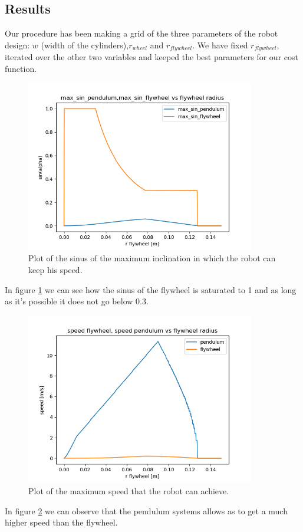 \subsection{Results}
Our procedure has been making a grid of the three parameters of the robot design: $w$ (width of the cylinders),$r_{wheel}$ and $r_{flywheel}$.
We have fixed $r_{flywheel}$, iterated over the other two variables and keeped the best parameters for our cost function.

\begin{figure}[H]
	\centering
	\includegraphics[width=10cm]{img/optimization/sin.png}
	\caption{Plot of the sinus of the maximum inclination in which the robot can keep his speed.}
	\label{fig:Sinus plot}
\end{figure}
In figure \ref{fig:Sinus plot} we can see how the sinus of the flywheel is saturated to 1 and as long as it's possible it does not go below $0.3$.

\begin{figure}[H]
	\centering
	\includegraphics[width=10cm]{img/optimization/speed.png}
	\caption{Plot of the maximum speed that the robot can achieve.}
	\label{fig:Speed plot}
\end{figure}
In figure \ref{fig:Speed plot} we can observe that the pendulum systems allows as to get a much higher speed than the flywheel.

